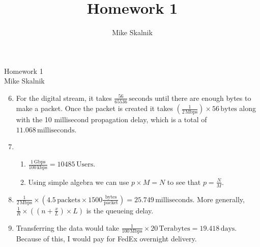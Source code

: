 \documentclass[12pt]{article}
\title{Homework 1}
\author{Mike Skalnik}
\newcommand{\s}[1]{\setcounter{enumi}{#1}}
\newcommand{\unit}[1]{\ensuremath{\, \mathrm{#1}}}
\begin{document}
\begin{flushright}{\large Homework 1\\ Mike Skalnik}\end{flushright}

\begin{enumerate}
  \s{5}
  \item For the digital stream, it takes $\frac{56}{65536} \unit{seconds}$ until there are enough bytes to make a packet. Once the packet is created it takes $\left(\frac{1}{2 \unit{Mbps}}\right) \times 56 \unit{bytes}$ along with the 10 millisecond propagation delay, which is a total of $11.068 \unit{milliseconds}$.

  \s{8}
  \item
    \begin{enumerate}
      \item $\frac{1 \unit{Gbps}}{100 \unit{kbps}} = 10485 \unit{Users}$.
      \item Using simple algebra we can use $p \times M = N$ to see that $p = \frac{N}{M}$.
    \end{enumerate}

  \s{10}
  \item $\frac{1}{2 \unit{Mbps}} \times \left(4.5 \unit{packets} \times 1500 \frac{\unit{bytes}}{\unit{packet}}\right) = 25.749 \unit{milliseconds}$. More generally, $\frac{1}{R} \times \left(\left(n + \frac{x}{L}\right) \times L\right)$ is the queueing delay. 

  \s{22}
  \item Transferring the data would take $\frac{1}{100 \unit{Mbps}} \times 20 \unit{Terabytes} = 19.418 \unit{days}$. Because of this, I would pay for FedEx overnight delivery.


\end{enumerate}
\end{document}
